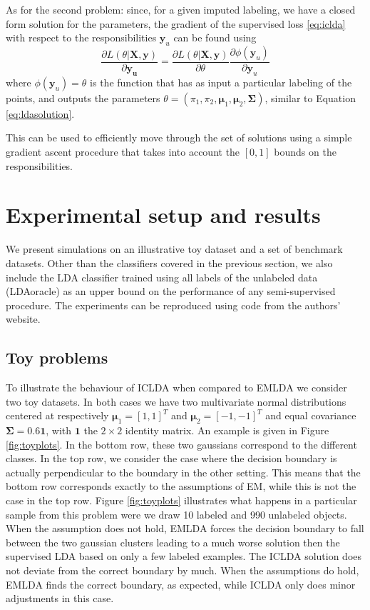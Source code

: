 As for the second problem: since, for a given imputed labeling, we have a closed form solution for the parameters, the gradient of the supervised loss \eqref{eq:iclda} with respect to the responsibilities $\mathbf{y}_u$ can be found using
\begin{equation}
\frac{\partial L(\theta|\mathbf{X},\mathbf{y})}{\partial \mathbf{y_u}} = \frac{\partial L(\theta|\mathbf{X},\mathbf{y})}{\partial \theta} \frac{\partial \phi(\mathbf{y}_u)}{\partial \mathbf{y}_u} 
\end{equation}
where $\phi(\mathbf{y}_u)=\theta$ is the function that has as input a particular labeling of the points, and outputs the parameters $\theta=\left(\pi_1,\pi_2, \boldsymbol{\mu}_1,\boldsymbol{\mu}_2,\mathbf{\Sigma}\right)$, similar to Equation \eqref{eq:ldasolution}.

This can be used to efficiently move through the set of solutions using a simple gradient ascent procedure that takes into account the $[0,1]$ bounds on the responsibilities.

\section{Experimental setup and results}
We present simulations on an illustrative toy dataset and a set of benchmark datasets. Other than the classifiers covered in the previous section, we also include the LDA classifier trained using all labels of the unlabeled data (LDAoracle) as an upper bound on the performance of any semi-supervised procedure. The experiments can be reproduced using code from the authors' website. 

\subsection{Toy problems}
To illustrate the behaviour of ICLDA when compared to EMLDA we consider two toy datasets. In both cases we have two multivariate normal distributions centered at respectively $\boldsymbol{\mu}_1=[1,1]^T$ and $\boldsymbol{\mu}_2=[-1,-1]^T$ and equal covariance $\mathbf{\Sigma}=0.6 \mathbf{1}$, with $\mathbf{1}$ the $2 \times 2$ identity matrix. An example is given in Figure \ref{fig:toyplots}. In the bottom row, these two gaussians correspond to the different classes. In the top row, we consider the case where the decision boundary is actually perpendicular to the boundary in the other setting. This means that the bottom row corresponds exactly to the assumptions of EM, while this is not the case in the top row. Figure \ref{fig:toyplots} illustrates what happens in a particular sample from this problem were we draw 10 labeled and 990 unlabeled objects. When the assumption does not hold, EMLDA forces the decision boundary to fall between the two gaussian clusters leading to a much worse solution then the supervised LDA based on only a few labeled examples. The ICLDA solution does not deviate from the correct boundary by much. When the assumptions do hold, EMLDA finds the correct boundary, as expected, while ICLDA only does minor adjustments in this case. 

